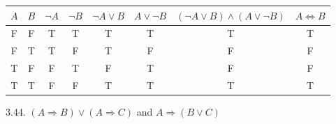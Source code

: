 \documentclass[10pt]{article}
\begin{document}
\begin{enumerate}[label={}]
            \begin{tabular}{ |c|c|c|c|c|c|c|c|  }
                  \hline
                  $A$ & $B$ & $\neg A$ & $\neg B$ & $\neg A \vee B$ & $A \vee \neg B$ & $(\neg A \vee B) \wedge(A \vee \neg B)$ & $A \Leftrightarrow B$ \\
                  \hline
                  F   & F   & T        & T        & T               & T               & T                                       & T                     \\
                  F   & T   & T        & F        & T               & F               & F                                       & F                     \\
                  T   & F   & F        & T        & F               & T               & F                                       & F                     \\
                  T   & T   & F        & F        & T               & T               & T                                       & T                     \\
                  \hline
            \end{tabular}


            3.44. $(A \Rightarrow B) \vee(A \Rightarrow C)$ and $A \Rightarrow(B \vee C)$



\end{enumerate}
\end{document}

